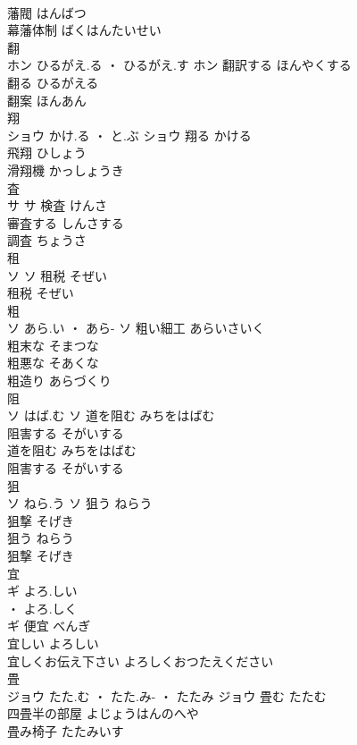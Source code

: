 \documentclass[8pt]{extreport}
\begin{document}
\begin{CJK}{UTF8}{min}
\\	藩閥	はんばつ	
\\	幕藩体制	ばくはんたいせい	
\\	翻	
\\	ホン	ひるがえ.る ・ ひるがえ.す	ホン	翻訳する	ほんやくする	
\\	翻る	ひるがえる	
\\	翻案	ほんあん	
\\	翔	
\\	ショウ	かけ.る ・ と.ぶ	ショウ	翔る	かける	
\\	飛翔	ひしょう	
\\	滑翔機	かっしょうき	
\\	査	
\\	サ		サ	検査	けんさ	
\\	審査する	しんさする	
\\	調査	ちょうさ	
\\	租	
\\	ソ		ソ	租税	そぜい	
\\	租税	そぜい	
\\	粗	
\\	ソ	あら.い ・ あら-	ソ	粗い細工	あらいさいく	
\\	粗末な	そまつな	
\\	粗悪な	そあくな	
\\	粗造り	あらづくり	
\\	阻	
\\	ソ	はば.む	ソ	道を阻む	みちをはばむ	
\\	阻害する	そがいする	
\\	道を阻む	みちをはばむ	
\\	阻害する	そがいする	
\\	狙	
\\	ソ	ねら.う	ソ	狙う	ねらう	
\\	狙撃	そげき	
\\	狙う	ねらう	
\\	狙撃	そげき	
\\	宜	
\\	ギ	よろ.しい
\\	・ よろ.しく
\\	ギ	便宜	べんぎ	
\\	宜しい	よろしい	
\\	宜しくお伝え下さい	よろしくおつたえください	
\\	畳	
\\	ジョウ	たた.む ・ たた.み- ・ たたみ	ジョウ	畳む	たたむ	
\\	四畳半の部屋	よじょうはんのへや	
\\	畳み椅子	たたみいす	

\end{CJK}
\end{document}

